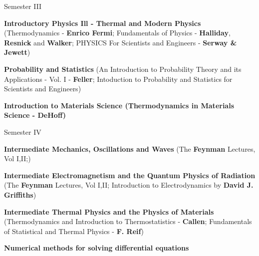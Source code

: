 \begin{cventries}
  \cventry
    {Semester III} %
    {} %
    {} %
    {} %
    {
      \begin{cvitems} %
        \item {\textbf{Introductory Physics Ill - Thermal and Modern Physics} (Thermodynamics - \textbf{Enrico Fermi}; Fundamentals of Physics - \textbf{Halliday}, \textbf{Resnick} and \textbf{Walker}; PHYSICS For Scientists and Engineers - \textbf{Serway \& Jewett})}
        \item {\textbf{Probability and Statistics} (An Introduction to Probability Theory and its Applications - Vol. I - \textbf{Feller}; Intoduction to Probability and Statistics for Scientists and Engineers)}
        \item{\textbf{Introduction to Materials Science (Thermodynamics in Materials Science - \textbf{DeHoff})}}
      \end{cvitems}
    }

  \cventry
    {Semester IV} %
    {} %
    {} %
    {} %
    {
      \begin{cvitems} %
        \item {\textbf{Intermediate Mechanics, Oscillations and Waves} (The \textbf{Feynman} Lectures, Vol I,II;)}
        \item {\textbf{Intermediate Electromagnetism and the Quantum Physics of Radiation} (The \textbf{Feynman} Lectures, Vol I,II; Introduction to Electrodynamics by \textbf{David J. Griffiths}) }
        \item{\textbf{Intermediate Thermal Physics and the Physics of Materials} (Thermodynamics and Introduction to Thermostatistics - \textbf{Callen}; Fundamentals of Statistical and Thermal Physics - \textbf{F. Reif})}
        \item {\textbf{Numerical methods for solving differential equations}}
      \end{cvitems}
    }


\end{cventries}
